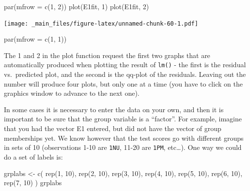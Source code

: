 \documentclass[
]{book}
\newenvironment{Shaded}{\begin{snugshade}}{\end{snugshade}}
\newcommand{\AttributeTok}[1]{\textcolor[rgb]{0.77,0.63,0.00}{#1}}
\newcommand{\DecValTok}[1]{\textcolor[rgb]{0.00,0.00,0.81}{#1}}
\newcommand{\FunctionTok}[1]{\textcolor[rgb]{0.00,0.00,0.00}{#1}}
\newcommand{\NormalTok}[1]{#1}
\newcommand{\OtherTok}[1]{\textcolor[rgb]{0.56,0.35,0.01}{#1}}
\begin{document}
\begin{Shaded}
\begin{Highlighting}[]
\FunctionTok{par}\NormalTok{(}\AttributeTok{mfrow =} \FunctionTok{c}\NormalTok{(}\DecValTok{1}\NormalTok{, }\DecValTok{2}\NormalTok{))}
\FunctionTok{plot}\NormalTok{(E1fit, }\DecValTok{1}\NormalTok{)}
\FunctionTok{plot}\NormalTok{(E1fit, }\DecValTok{2}\NormalTok{)}
\end{Highlighting}
\end{Shaded}

\texttt{[image: \_main\_files/figure-latex/unnamed-chunk-60-1.pdf]}

\begin{Shaded}
\begin{Highlighting}[]
\FunctionTok{par}\NormalTok{(}\AttributeTok{mfrow =} \FunctionTok{c}\NormalTok{(}\DecValTok{1}\NormalTok{, }\DecValTok{1}\NormalTok{))}
\end{Highlighting}
\end{Shaded}

The 1 and 2 in the plot function request the first two graphs that are automatically produced when plotting the result of \texttt{lm()} - the first is the residual vs.~predicted plot, and the second is the qq-plot of the residuals. Leaving out the number will produce four plots, but only one at a time (you have to click on the graphics window to advance to the next one).

In some cases it is necessary to enter the data on your own, and then it is important to be sure that the group variable is a ``factor''. For example, imagine that you had the vector E1 entered, but did not have the vector of group memberships yet. We know however that the test scores go with different groups in sets of 10 (observations 1-10 are \texttt{1NU}, 11-20 are \texttt{1PM}, etc\ldots). One way we could do a set of labels is:

\begin{Shaded}
\begin{Highlighting}[]
\NormalTok{grplabs }\OtherTok{\textless{}{-}} \FunctionTok{c}\NormalTok{(}
  \FunctionTok{rep}\NormalTok{(}\DecValTok{1}\NormalTok{, }\DecValTok{10}\NormalTok{), }\FunctionTok{rep}\NormalTok{(}\DecValTok{2}\NormalTok{, }\DecValTok{10}\NormalTok{), }\FunctionTok{rep}\NormalTok{(}\DecValTok{3}\NormalTok{, }\DecValTok{10}\NormalTok{),}
  \FunctionTok{rep}\NormalTok{(}\DecValTok{4}\NormalTok{, }\DecValTok{10}\NormalTok{), }\FunctionTok{rep}\NormalTok{(}\DecValTok{5}\NormalTok{, }\DecValTok{10}\NormalTok{), }\FunctionTok{rep}\NormalTok{(}\DecValTok{6}\NormalTok{, }\DecValTok{10}\NormalTok{), }\FunctionTok{rep}\NormalTok{(}\DecValTok{7}\NormalTok{, }\DecValTok{10}\NormalTok{)}
\NormalTok{)}
\NormalTok{grplabs}
\end{Highlighting}
\end{Shaded}
\end{document}
